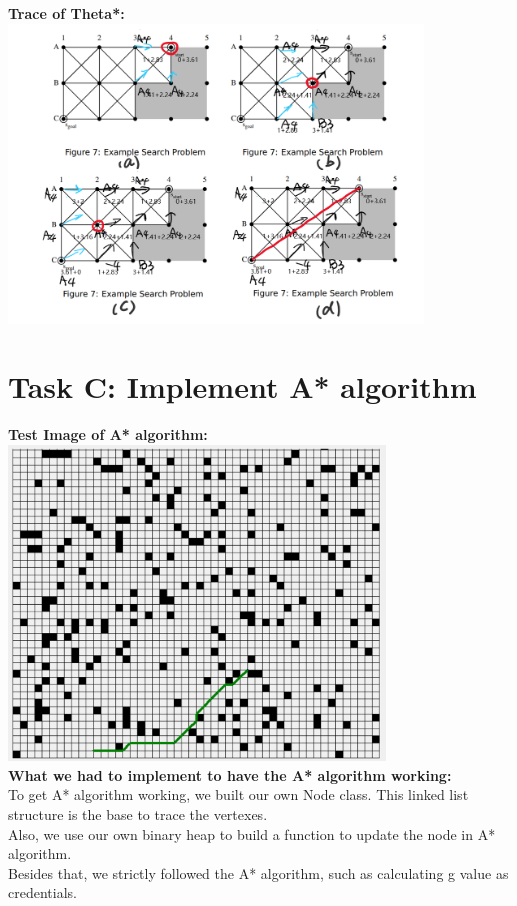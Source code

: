 \documentclass[12pt, letterpaper]{article}
\begin{document}
\textbf{Trace of Theta*:}\\
\includegraphics[width=11cm]{1b-theta}\\


\section{Task C: Implement A* algorithm}
\textbf{Test Image of A* algorithm:}\\
\includegraphics[width=10cm]{1c-Atest}\\
\textbf{What we had to implement to have the A* algorithm working:}\\
To get A* algorithm working, we built our own Node class. This linked list structure is the base to trace the vertexes.\\
Also, we use our own binary heap to build a function to update the node in A* algorithm.\\
Besides that, we strictly followed the A* algorithm, such as calculating g value as credentials.\\
\end{document}
